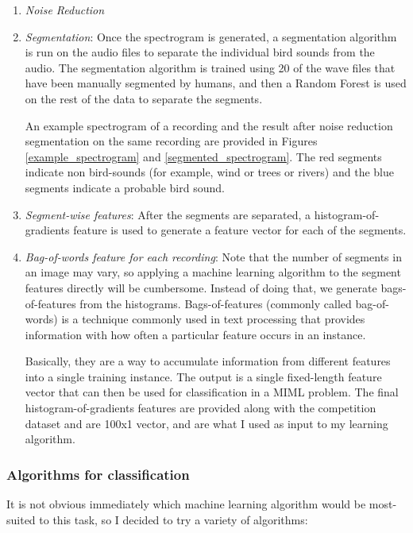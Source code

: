 \documentclass[11pt]{article}
\begin{document}
\begin{enumerate}
\item \textit{Noise Reduction}
\item \textit{Segmentation}: Once the spectrogram is generated, a segmentation algorithm is run on the audio files to separate the individual bird sounds from the audio. The segmentation algorithm is trained using 20 of the wave files that have been manually segmented by humans, and then a Random Forest is used on the rest of the data to separate the segments. 

An example spectrogram of a recording and the result after noise reduction segmentation on the same recording are provided in Figures \ref{example_spectrogram} and \ref{segmented_spectrogram}. The red segments indicate non bird-sounds (for example, wind or trees or rivers) and the blue segments indicate a probable bird sound.

\item \textit{Segment-wise features}: After the segments are separated, a histogram-of-gradients feature is used to generate a feature vector for each of the segments. 

\item \textit{Bag-of-words feature for each recording}: Note that the number of segments in an image may vary, so applying a machine learning algorithm to the segment features directly will be cumbersome. Instead of doing that, we generate bags-of-features from the histograms. Bags-of-features (commonly called bag-of-words) is a technique commonly used in text processing that provides information with how often a particular feature occurs in an instance. 

Basically, they are a way to accumulate information from different features into a single training instance. The output is a single fixed-length feature vector that can then be used for classification in a MIML problem. The final histogram-of-gradients features are provided along with the competition dataset and are 100x1 vector, and are what I used as input to my learning algorithm.

\end{enumerate}

\subsubsection{Algorithms for classification}
\label{sec-algorithms}

It is not obvious immediately which machine learning algorithm would be most-suited to this task, so I decided to try a variety of algorithms:
\end{document}

